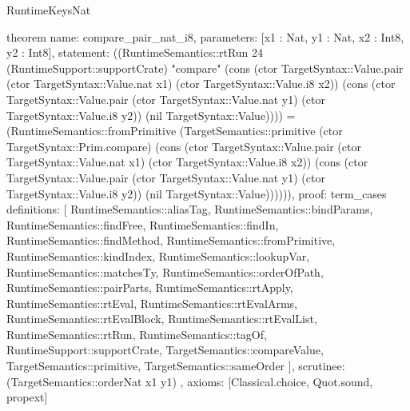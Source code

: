\begin{lexlean}{RuntimeKeysNat}
\begin{semanticmodule}
theorem{
  name: compare_pair_nat_i8,
  parameters: [x1 : Nat, y1 : Nat, x2 : Int8, y2 : Int8],
  statement: ((RuntimeSemantics::rtRun 24 (RuntimeSupport::supportCrate) "compare" (cons (ctor TargetSyntax::Value.pair (ctor TargetSyntax::Value.nat x1) (ctor TargetSyntax::Value.i8 x2)) (cons (ctor TargetSyntax::Value.pair (ctor TargetSyntax::Value.nat y1) (ctor TargetSyntax::Value.i8 y2)) (nil TargetSyntax::Value)))) = (RuntimeSemantics::fromPrimitive (TargetSemantics::primitive (ctor TargetSyntax::Prim.compare) (cons (ctor TargetSyntax::Value.pair (ctor TargetSyntax::Value.nat x1) (ctor TargetSyntax::Value.i8 x2)) (cons (ctor TargetSyntax::Value.pair (ctor TargetSyntax::Value.nat y1) (ctor TargetSyntax::Value.i8 y2)) (nil TargetSyntax::Value)))))),
  proof: term_cases{
    definitions: [
      RuntimeSemantics::aliasTag,
      RuntimeSemantics::bindParams,
      RuntimeSemantics::findFree,
      RuntimeSemantics::findIn,
      RuntimeSemantics::findMethod,
      RuntimeSemantics::fromPrimitive,
      RuntimeSemantics::kindIndex,
      RuntimeSemantics::lookupVar,
      RuntimeSemantics::matchesTy,
      RuntimeSemantics::orderOfPath,
      RuntimeSemantics::pairParts,
      RuntimeSemantics::rtApply,
      RuntimeSemantics::rtEval,
      RuntimeSemantics::rtEvalArms,
      RuntimeSemantics::rtEvalBlock,
      RuntimeSemantics::rtEvalList,
      RuntimeSemantics::rtRun,
      RuntimeSemantics::tagOf,
      RuntimeSupport::supportCrate,
      TargetSemantics::compareValue,
      TargetSemantics::primitive,
      TargetSemantics::sameOrder
    ],
    scrutinee: (TargetSemantics::orderNat x1 y1)
  },
  axioms: [Classical.choice, Quot.sound, propext]
}


\end{semanticmodule}
\end{lexlean}
